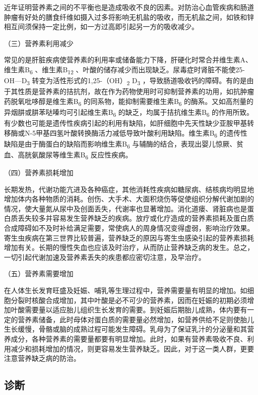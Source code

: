 近年证明营养素之间的不平衡也是造成吸收不良的因素。对防治心血管疾病和肠道肿瘤有好处的膳食纤维如摄入过多将影响无机盐的吸收，而无机盐之间，如铁和锌相互间须保持一定比例，如一方过高即引起另一方的吸收减少。

（三）营养素利用减少

常见的是肝脏疾病使营养素的利用率或储备能力下降，肝硬化时常合并维生素A、维生素B\textsubscript{6}
、维生素B\textsubscript{12}
、叶酸的储存减少而出现缺乏。尿毒症时肾脏不能使25-OH---D\textsubscript{3}
转变为活性形式的1,25-（OH）\textsubscript{2} D\textsubscript{3}
，导致肠道吸收钙的障碍。有的是由于其性质是营养素的拮抗剂，故在作为药物使用时可抑制营养素的功用，如抗肿瘤药脱氧吡哆醇是维生素B\textsubscript{6}
的同系物，能抑制需要维生素B\textsubscript{6}
的酶系。又如高剂量的异烟肼或肼苯哒嗪均可引起维生素B\textsubscript{6}
的缺乏，均属于拮抗维生素B\textsubscript{6}
的作用所致。有少数也可能是遗传性疾病引起的利用有缺陷，如肝细胞中先天性缺少亚胺甲基转移酶或N-5甲基四氢叶酸转换酶活力减低导致叶酸利用缺陷。维生素B\textsubscript{6}
的遗传性缺陷是由于酶蛋白的缺陷而影响维生素B\textsubscript{6}
与辅酶的结合，表现出婴儿惊厥、贫血、高胱氨酸尿等维生素B\textsubscript{6}
反应性疾病。

（四）营养素损耗增加

长期发热，代谢功能亢进及各种癌症，其他消耗性疾病如糖尿病、结核病均明显地增加体内各种物质的消耗。创伤、大手术、大面积烧伤等促使组织分解代谢加剧的情况，使大量氮从尿中及创面丢失，代谢率也显著增加。消化道瘘、肾脏病也是蛋白质丢失较多并容易发生营养缺乏的疾病。放疗或化疗造成的营养素损耗及蛋白质合成障碍如不及时补给满足需要，常使病人的周身情况变得虚弱，影响治疗效果。寄生虫疾病在第三世界比较普遍，营养缺乏的原因与寄生虫感染引起的营养素损耗增加有关。长期的慢性失血也应该及时治疗，从而防止营养缺乏病的发生。总之，一切引起代谢加速及营养素丢失的疾患都应密切注意，及早治疗。

（五）营养素需要增加

在人体生长发育旺盛及妊娠、哺乳等生理过程中，营养需要量有明显的增加。如细胞分裂时核酸合成增加，其中叶酸是必不可少的营养素，因而在妊娠的初期必须增加叶酸需要量以适应胎儿组织生长发育的需要。到妊娠后期胎儿成熟，体内要有一定的营养素储备，此时母体对蛋白质的需要量必然增加，如营养供给不足则使胎儿生长缓慢，骨骼或脑的成熟过程可能发生障碍。乳母为了保证乳汁的分泌量和其营养成分，各种营养素的需要量都要有明显增加。此时，如果有营养素吸收不良、利用减少和损耗增加的情况，则更容易发生营养缺乏。因此，对于这一类人群，更要注意营养缺乏病的防治。

\hypertarget{text00003.htmlux5cux23mllj6}{%
\subsection{诊断}\label{text00003.htmlux5cux23mllj6}}

